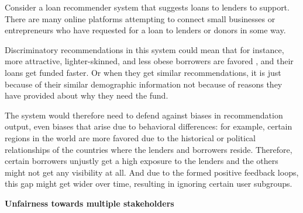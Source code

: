 Consider a loan recommender system that suggests loans to lenders to support. There are many online platforms attempting to connect small businesses or entrepreneurs who have requested for a loan to lenders or donors in some way. 

Discriminatory recommendations in this system could mean that for instance, more attractive, lighter-skinned, and less obese borrowers are favored \cite{JENQ2015234}, and their loans get funded faster. Or when they get similar recommendations, it is just because of their similar demographic information not because of reasons they have provided about why they need the fund.

The system would therefore need to defend against biases in recommendation output, even biases that arise due to behavioral differences: for example, certain regions in the world are more favored due to the historical or political relationships of the countries where the lenders and borrowers reside. Therefore, certain borrowers unjustly get a high exposure to the lenders and the others might not get any visibility at all. And due to the formed positive feedback loops, this gap might get wider over time, resulting in ignoring certain user subgroups.




\textbf{Unfairness towards multiple stakeholders}

